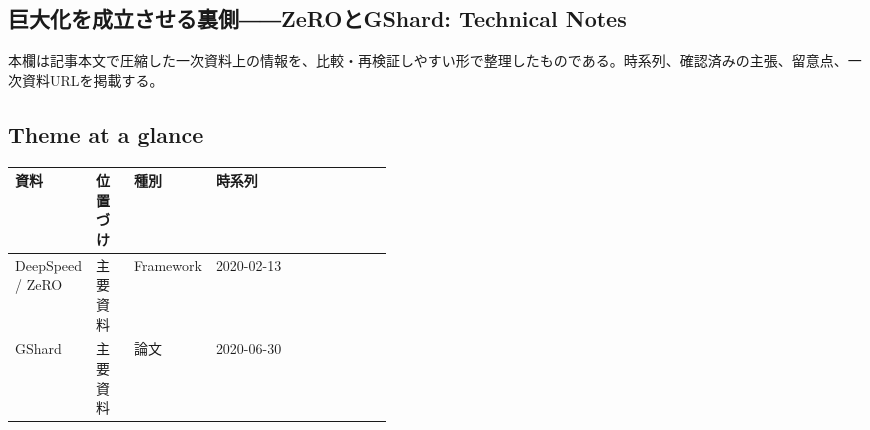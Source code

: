 \subsection*{巨大化を成立させる裏側――ZeROとGShard: Technical Notes}
本欄は記事本文で圧縮した一次資料上の情報を、比較・再検証しやすい形で整理したものである。時系列、確認済みの主張、留意点、一次資料URLを掲載する。
\smallskip
{}\par
\medskip
\subsection*{Theme at a glance}
\begin{center}
\footnotesize
\begin{tabularx}{\linewidth}{@{}p{0.20\linewidth}p{0.10\linewidth}p{0.14\linewidth}X@{}}
\toprule
資料 & 位置づけ & 種別 & 時系列 \\
\midrule
DeepSpeed / ZeRO & 主要資料 & Framework & 2020-02-13 \\
GShard & 主要資料 & 論文 & 2020-06-30 \\
\bottomrule
\end{tabularx}
\end{center}
\normalsize

